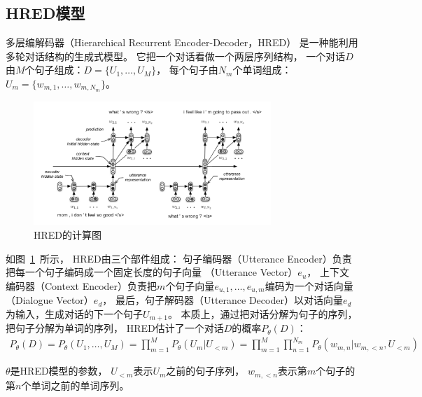 \subsection{HRED模型}\label{subsec:HRED}
多层编解码器（Hierarchical Recurrent Encoder-Decoder，HRED）
是一种能利用多轮对话结构的生成式模型。
它把一个对话看做一个两层序列结构，
一个对话$D$由$M$个句子组成：$D = \{ U_1, \dots, U_M \}$，
每个句子由$N_m$个单词组成：$U_m = \{ w_{m, 1}, \dots, w_{m, N_m} \}$。
\begin{figure}[H]
    \centering
    \includegraphics[width=0.8\textwidth]{figure/HRED.png}
    \caption{HRED的计算图}
    \label{fig:HRED}
\end{figure}

如图~\ref{fig:HRED}~所示，
HRED由三个部件组成：
句子编码器（Utterance Encoder）负责把每一个句子编码成一个固定长度的句子向量
（Utterance Vector）$e_u$，
上下文编码器（Context Encoder）负责把$m$个句子向量$e_{u,1}, \dots, e_{u,m}$编码为一个对话向量
（Dialogue Vector）$e_d$，
最后，句子解码器（Utterance Decoder）以对话向量$e_d$为输入，生成对话的下一个句子$U_{m+1}$。
本质上，通过把对话分解为句子的序列，把句子分解为单词的序列，
HRED估计了一个对话$D$的概率$P_{\theta}(D)$：
\begin{align}
    P_{\theta}(D) =
    P_{\theta}(U_1, \dots, U_M) = \prod_{m=1}^M P_{\theta}(U_m|U_{<m})
    = \prod_{m=1}^M \prod_{n=1}^{N_m} P_{\theta}( w_{m, n} |w_{m, <n}, U_{<m} )
\end{align}

$\theta$是HRED模型的参数，
$U_{<m}$表示$U_m$之前的句子序列，
$w_{m, <n}$表示第$m$个句子的第$n$个单词之前的单词序列。



